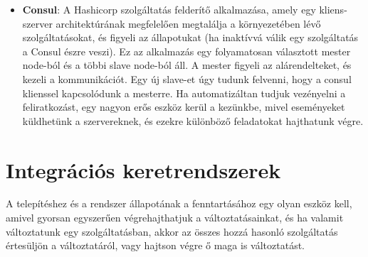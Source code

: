\documentclass[11pt,magyar,a4paper,oneside,]{report}
\providecommand{\tightlist}{%
  \setlength{\itemsep}{0pt}\setlength{\parskip}{0pt}}
\begin{document}
\begin{itemize}
\tightlist
\item
  \textbf{Consul}\citep{consul}: A Hashicorp szolgáltatás felderítő
  alkalmazása, amely egy kliens-szerver architektúrának megfelelően
  megtalálja a környezetében lévő szolgáltatásokat, és figyeli az
  állapotukat (ha inaktívvá válik egy szolgáltatás a Consul észre
  veszi). Ez az alkalmazás egy folyamatosan választott mester node-ból
  és a többi slave node-ból áll. A mester figyeli az alárendelteket, és
  kezeli a kommunikációt. Egy új slave-et úgy tudunk felvenni, hogy a
  consul klienssel kapcsolódunk a mesterre. Ha automatizáltan tudjuk
  vezényelni a feliratkozást, egy nagyon erős eszköz kerül a kezünkbe,
  mivel eseményeket küldhetünk a szervereknek, és ezekre különböző
  feladatokat hajthatunk végre.
\end{itemize}

\section{Integrációs
keretrendszerek}\label{integruxe1ciuxf3s-keretrendszerek}

A telepítéshez és a rendszer állapotának a fenntartásához egy olyan
eszköz kell, amivel gyorsan egyszerűen végrehajthatjuk a
változtatásainkat, és ha valamit változtatunk egy szolgáltatásban, akkor
az összes hozzá hasonló szolgáltatás értesüljön a változtatáról, vagy
hajtson végre ő maga is változtatást.
\end{document}

